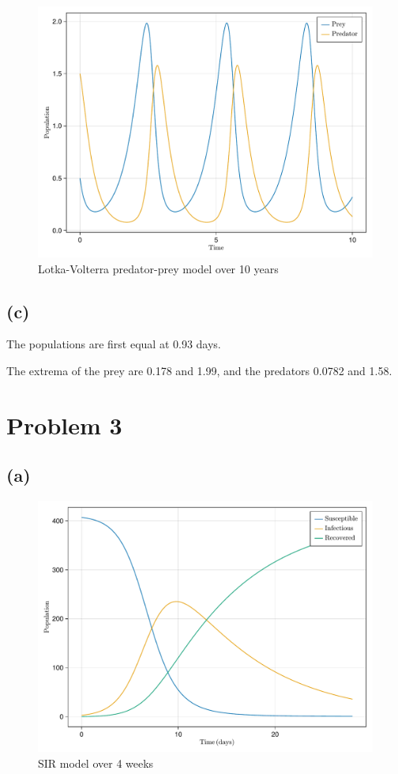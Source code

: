 \documentclass[a4paper, british]{article}
\begin{document}
\begin{figure}[H]
    \centering
    \includegraphics[width=\textwidth]{figures/f2.pdf}
    \caption{Lotka-Volterra predator-prey model over 10 years}
    \label{fig:2}
\end{figure}

\subsection*{(c)}

The populations are first equal at 0.93 days.

The extrema of the prey are 0.178 and 1.99, and the predators 0.0782 and 1.58.

\newpage

\section{Problem 3}

\subsection*{(a)}

\begin{figure}[H]
    \centering
    \includegraphics[width=\textwidth]{figures/f3.pdf}
    \caption{SIR model over 4 weeks}
    \label{fig:3}
\end{figure}
\end{document}
